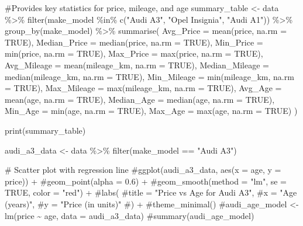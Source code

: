 \documentclass[
  letterpaper,
  DIV=11,
  numbers=noendperiod]{scrartcl}
\newenvironment{Shaded}{\begin{snugshade}}{\end{snugshade}}
\newcommand{\AttributeTok}[1]{\textcolor[rgb]{0.40,0.45,0.13}{#1}}
\newcommand{\CommentTok}[1]{\textcolor[rgb]{0.37,0.37,0.37}{#1}}
\newcommand{\ConstantTok}[1]{\textcolor[rgb]{0.56,0.35,0.01}{#1}}
\newcommand{\FunctionTok}[1]{\textcolor[rgb]{0.28,0.35,0.67}{#1}}
\newcommand{\NormalTok}[1]{\textcolor[rgb]{0.00,0.23,0.31}{#1}}
\newcommand{\OtherTok}[1]{\textcolor[rgb]{0.00,0.23,0.31}{#1}}
\newcommand{\SpecialCharTok}[1]{\textcolor[rgb]{0.37,0.37,0.37}{#1}}
\newcommand{\StringTok}[1]{\textcolor[rgb]{0.13,0.47,0.30}{#1}}
\begin{document}
\begin{Shaded}
\begin{Highlighting}[]
\CommentTok{\#Provides key statistics for price, mileage, and age}
\NormalTok{summary\_table }\OtherTok{\textless{}{-}}\NormalTok{ data }\SpecialCharTok{\%\textgreater{}\%}
  \FunctionTok{filter}\NormalTok{(make\_model }\SpecialCharTok{\%in\%} \FunctionTok{c}\NormalTok{(}\StringTok{"Audi A3"}\NormalTok{, }\StringTok{"Opel Insignia"}\NormalTok{, }\StringTok{"Audi A1"}\NormalTok{)) }\SpecialCharTok{\%\textgreater{}\%}
  \FunctionTok{group\_by}\NormalTok{(make\_model) }\SpecialCharTok{\%\textgreater{}\%}
  \FunctionTok{summarise}\NormalTok{(}
    \AttributeTok{Avg\_Price =} \FunctionTok{mean}\NormalTok{(price, }\AttributeTok{na.rm =} \ConstantTok{TRUE}\NormalTok{),}
    \AttributeTok{Median\_Price =} \FunctionTok{median}\NormalTok{(price, }\AttributeTok{na.rm =} \ConstantTok{TRUE}\NormalTok{),}
    \AttributeTok{Min\_Price =} \FunctionTok{min}\NormalTok{(price, }\AttributeTok{na.rm =} \ConstantTok{TRUE}\NormalTok{),}
    \AttributeTok{Max\_Price =} \FunctionTok{max}\NormalTok{(price, }\AttributeTok{na.rm =} \ConstantTok{TRUE}\NormalTok{),}
    \AttributeTok{Avg\_Mileage =} \FunctionTok{mean}\NormalTok{(mileage\_km, }\AttributeTok{na.rm =} \ConstantTok{TRUE}\NormalTok{),}
    \AttributeTok{Median\_Mileage =} \FunctionTok{median}\NormalTok{(mileage\_km, }\AttributeTok{na.rm =} \ConstantTok{TRUE}\NormalTok{),}
    \AttributeTok{Min\_Mileage =} \FunctionTok{min}\NormalTok{(mileage\_km, }\AttributeTok{na.rm =} \ConstantTok{TRUE}\NormalTok{),}
    \AttributeTok{Max\_Mileage =} \FunctionTok{max}\NormalTok{(mileage\_km, }\AttributeTok{na.rm =} \ConstantTok{TRUE}\NormalTok{),}
    \AttributeTok{Avg\_Age =} \FunctionTok{mean}\NormalTok{(age, }\AttributeTok{na.rm =} \ConstantTok{TRUE}\NormalTok{),}
    \AttributeTok{Median\_Age =} \FunctionTok{median}\NormalTok{(age, }\AttributeTok{na.rm =} \ConstantTok{TRUE}\NormalTok{),}
    \AttributeTok{Min\_Age =} \FunctionTok{min}\NormalTok{(age, }\AttributeTok{na.rm =} \ConstantTok{TRUE}\NormalTok{),}
    \AttributeTok{Max\_Age =} \FunctionTok{max}\NormalTok{(age, }\AttributeTok{na.rm =} \ConstantTok{TRUE}\NormalTok{)}
\NormalTok{  )}

\FunctionTok{print}\NormalTok{(summary\_table)}
      
\NormalTok{ audi\_a3\_data }\OtherTok{\textless{}{-}}\NormalTok{ data }\SpecialCharTok{\%\textgreater{}\%} \FunctionTok{filter}\NormalTok{(make\_model }\SpecialCharTok{==} \StringTok{"Audi A3"}\NormalTok{)}

\CommentTok{\# Scatter plot with regression line}
\CommentTok{\#ggplot(audi\_a3\_data, aes(x = age, y = price)) +}
  \CommentTok{\#geom\_point(alpha = 0.6) +}
  \CommentTok{\#geom\_smooth(method = "lm", se = TRUE, color = "red") +}
  \CommentTok{\#labs(}
    \CommentTok{\#title = "Price vs Age for Audi A3",}
    \CommentTok{\#x = "Age (years)",}
    \CommentTok{\#y = "Price (in units)"}
  \CommentTok{\#) +}
  \CommentTok{\#theme\_minimal()}
\CommentTok{\#audi\_age\_model \textless{}{-} lm(price \textasciitilde{} age, data = audi\_a3\_data)}
\CommentTok{\#summary(audi\_age\_model)}



\end{Highlighting}
\end{Shaded}
\end{document}

